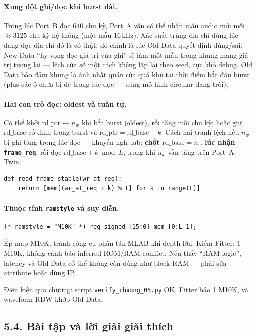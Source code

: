 \paragraph{Xung đột ghi/đọc khi burst dài.} Trong lúc Port~B đọc $640$ chu kỳ, Port~A vẫn có thể nhận mẫu audio mới mỗi $\approx 3125$ chu kỳ hệ thống (một mẫu $16\,\text{kHz}$). Xác suất trùng địa chỉ đúng lúc đang đọc địa chỉ đó là có thật: đó chính là lúc Old Data quyết định đúng/sai. New Data ``hy vọng đọc giá trị vừa ghi'' sẽ làm một mẫu trong khung mang giá trị tương lai --- lệch cửa sổ một cách không lặp lại theo seed, cực khó debug. Old Data bảo đảm khung là ảnh nhất quán của quá khứ tại thời điểm bắt đầu burst (plus các ô chưa bị đè trong lúc đọc --- đúng mô hình circular đang trôi).

\paragraph{Hai con trỏ đọc: oldest và tuần tự.} Có thể khởi $\mathrm{rd\_ptr}\leftarrow n_w$ khi bắt burst (oldest), rồi tăng mỗi chu kỳ; hoặc giữ $\mathrm{rd\_base}$ cố định trong burst và $\mathrm{rd\_ptr}=\mathrm{rd\_base}+k$. Cách hai tránh lệch nếu $n_w$ bị ghi tăng trong lúc đọc --- khuyến nghị lab: \textbf{chốt $\mathrm{rd\_base}=n_w$ lúc nhận \texttt{frame\_req}}, rồi đọc $\mathrm{rd\_base}+k\bmod L$, trong khi $n_w$ vẫn tăng trên Port~A. Twin:
\begin{verbatim}
def read_frame_stable(wr_at_req):
    return [mem[(wr_at_req + k) % L] for k in range(L)]
\end{verbatim}

\paragraph{Thuộc tính \texttt{ramstyle} và suy diễn.}
\begin{verbatim}
(* ramstyle = "M10K" *) reg signed [15:0] mem [0:L-1];
\end{verbatim}
Ép map M10K, tránh công cụ phân tán MLAB khi depth lớn. Kiểm Fitter: $1$ M10K, không cảnh báo inferred ROM/RAM conflict. Nếu thấy ``RAM logic'', latency và Old Data có thể không còn đúng như block RAM --- phải sửa attribute hoặc dùng IP.

Điều kiện qua chương: script \texttt{verify\_chuong\_05.py} OK, Fitter báo 1 M10K, và waveform RDW khớp Old Data.


\subsection*{5.4. Bài tập và lời giải giải thích}

